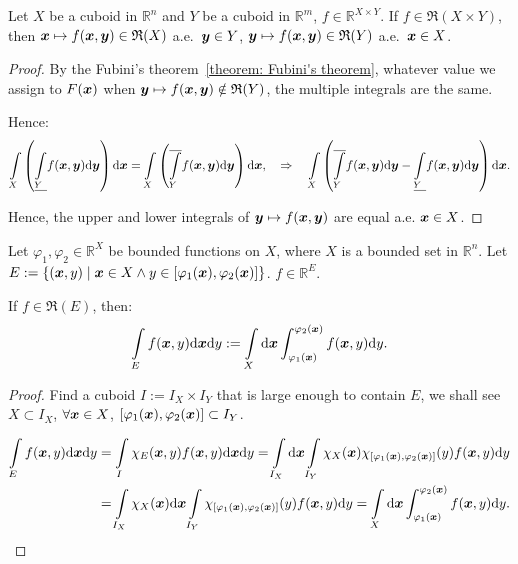 \documentclass[openany]{book}
\begin{document}
\begin{corollary}
	Let $X$ be a cuboid in $\mathbb R^n$ and $Y$ be a cuboid in $\mathbb R^m$, $f \in \mathbb R^{X \times Y}$. 
	If $f \in \mathfrak R(X \times Y)$, then $\boldsymbol{x} \mapsto f(\boldsymbol{x}, \boldsymbol{y}) \in \mathfrak R(X)$ a.e.\ $\boldsymbol{y} \in Y$, $\boldsymbol{y} \mapsto f(\boldsymbol{x}, \boldsymbol{y}) \in \mathfrak R(Y)$ a.e.\ $\boldsymbol{x} \in X$.
\end{corollary}
\begin{proof}
	By the Fubini's theorem~\ref{theorem: Fubini's theorem}, whatever value we assign to $F(\boldsymbol{x})$ when $\boldsymbol{y} \mapsto f(\boldsymbol{x}, \boldsymbol{y}) \notin \mathfrak R(Y)$, the multiple integrals are the same.

	Hence:
	\begin{equation*}
		\int\limits_X \left(
			\underline{\int\limits_Y} f(\boldsymbol{x}, \boldsymbol{y}) \mathrm{d} \boldsymbol{y} 
		\right) \mathrm{d} \boldsymbol{x}
		= \int\limits_X \left(
			\overline{\int\limits_Y} f(\boldsymbol{x}, \boldsymbol{y}) \mathrm{d} \boldsymbol{y} 
		\right) \mathrm{d} \boldsymbol{x},
		\quad\Rightarrow\quad
		\int\limits_X \left(
			\overline{\int\limits_Y} f(\boldsymbol{x}, \boldsymbol{y}) \mathrm{d} \boldsymbol{y}
			- \underline{\int\limits_Y} f(\boldsymbol{x}, \boldsymbol{y}) \mathrm{d} \boldsymbol{y} 
		\right) \mathrm{d} \boldsymbol{x}.
	\end{equation*}

	Hence, the upper and lower integrals of $\boldsymbol{y} \mapsto f(\boldsymbol{x}, \boldsymbol{y})$ are equal a.e. $\boldsymbol{x} \in X$.
\end{proof}

\begin{theorem}
	Let $\varphi_1, \varphi_2 \in \mathbb R^X$ be bounded functions on $X$, where $X$ is a bounded set in $\mathbb R^n$. 
	Let $E := \{ (\boldsymbol{x}, y) \mid \boldsymbol{x} \in X \wedge y \in [\varphi_1(\boldsymbol{x}), \varphi_2(\boldsymbol{x})] \}$.
	$f \in \mathbb R^E$.

	If $f \in \mathfrak R(E)$, then:
	\begin{equation*}
		\int\limits_E f(\boldsymbol{x}, y) \mathrm{d} \boldsymbol{x} \mathrm{d} y 
			:= \int\limits_X \mathrm{d} \boldsymbol{x} \int^{\varphi_2(\boldsymbol{x})}_{\varphi_1(\boldsymbol{x})} f(\boldsymbol{x}, y) \mathrm{d} y.
	\end{equation*}
\end{theorem}
\begin{proof}
	Find a cuboid $I := I_X \times I_Y$ that is large enough to contain $E$, we shall see $X \subset I_X$, $\forall \boldsymbol{x} \in X$, $[\varphi_1(\boldsymbol{x}), \varphi_2(\boldsymbol{x})] \subset I_Y$. 

	\begin{align*}
		\int\limits_E f(\boldsymbol{x}, y) \mathrm{d} \boldsymbol{x} \mathrm{d} y
		&= \int\limits_I \chi_E(\boldsymbol{x}, y) f(\boldsymbol{x}, y) \mathrm{d} \boldsymbol{x} \mathrm{d} y
		= \int\limits_{I_X} \mathrm{d} \boldsymbol{x} \int\limits_{I_Y} \chi_X (\boldsymbol{x}) \chi_{[\varphi_1(\boldsymbol{x}), \varphi_2(\boldsymbol{x})]} (y) f(\boldsymbol{x}, y)  \mathrm{d} y
		\\
		&= \int\limits_{I_X} \chi_X (\boldsymbol{x}) \mathrm{d} \boldsymbol{x} 
			\int\limits_{I_Y}  \chi_{[\varphi_1(\boldsymbol{x}), \varphi_2(\boldsymbol{x})]} (y) f(\boldsymbol{x}, y)  \mathrm{d} y
		= \int\limits_X \mathrm{d} \boldsymbol{x} \int^{\varphi_2(\boldsymbol{x})}_{\varphi_1(\boldsymbol{x})} f(\boldsymbol{x}, y) \mathrm{d} y.
	\end{align*}
\end{proof}
\end{document}
